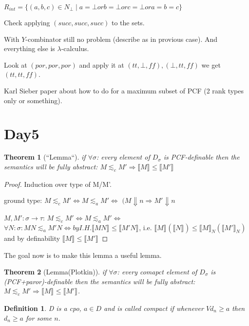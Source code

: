 \documentclass[a4paper,10pt]{book}
\newtheorem{theorem}{Theorem}
\newtheorem{definition}{Definition}
\newcommand{\sem}[2]{ \llbracket#1\rrbracket_{#2} }
\newcommand{\rarr}{ \rightarrow }
\renewcommand{\tt}{ tt }
\newcommand{\ff}{ ff }
\begin{document}
\begin{enumerate}
  $R_{int}  = \{ (a,b,c)\in N_\bot \mid a=\bot or b=\bot or c=\bot or a=b=c \}$
  
  Check applying $(succ,succ,succ)$ to the sets.
  
  With $Y$-combinator still no problem (describe as in provious case). And everything else is 
  $\lambda$-calculus.
  
  Look at $(por,por,por)$ and apply it at $(\tt,\bot,\ff), (\bot,\tt,\ff)$ we get
  $(\tt,\tt,\ff)$.
  
  Karl Sieber paper about how to do for a maximum subset of PCF (2 rank types only or something).
  
  
\end{enumerate}

\section{Day5}

\begin{theorem}[``Lemma``]
if $\forall \sigma$: every element of $D_\sigma$ is PCF-definable then the semantics will be 
fully abstract: $M\lesssim_cM' \Rightarrow \sem{M}{} \leq \sem{M'}{}$
\end{theorem}

\begin{proof}
 Induction over type of M/M'.
 
 ground type: $M\lesssim_c M' \Leftrightarrow M\lesssim_a M' \Leftrightarrow$ 
 $(M\Downarrow n \Rightarrow M'\Downarrow n$
 
 $M,M': \sigma \rarr \tau$: $M\lesssim_c M' \Leftrightarrow M\lesssim_a M' \Leftrightarrow$ 
 $\forall N:\sigma: MN\lesssim_a M'N \Leftrightarrow by I.H. \sem{MN}{} \leq \sem{M'N}{}$, i.e.
 $\sem{M}{}(\sem{N}{}) \leq \sem{M}{N}(\sem{M'}{N})$ and by definability 
 $\sem{M}{} \leq \sem{M'}{}$
\end{proof}

The goal now is to make this lemma a useful lemma.

\begin{theorem}[Lemma(Plotkin)]
if $\forall \sigma$: every comapct element of $D_\sigma$ is (PCF+paror)-definable then the 
semantics will be fully abstract: $M\lesssim_cM' \Rightarrow \sem{M}{} \leq \sem{M'}{}$.
\end{theorem}

\begin{definition}
 D is a cpo, $a\in D$ and is called compact if whenever $Vd_n \geq a$ then 
 $d_n \geq a$ for some $n$.
\end{definition}
\end{document}
